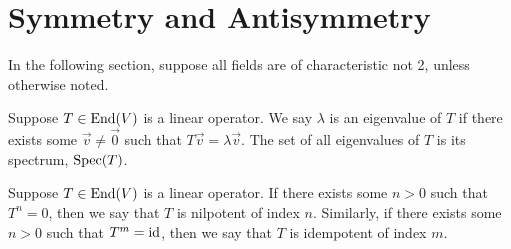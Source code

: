 \section{Symmetry and Antisymmetry}

\begin{remark}
    In the following section,
    suppose all fields are of characteristic not 2,
    unless otherwise noted.
\end{remark}

\begin{definition}
    Suppose \(T \in \operatorname{End}(V)\) is a linear operator.
    We say \(\lambda\) is an eigenvalue of \(T\)
    if there exists some \(\vec{v} \neq \vec{0}\) such that \(T\vec{v} = \lambda\vec{v}\).
    The set of all eigenvalues of \(T\) is its spectrum, \(\operatorname{Spec}(T)\).
\end{definition}
\begin{definition}
    Suppose \(T \in \operatorname{End}(V)\) is a linear operator.
    If there exists some \(n > 0\) such that \(T^n = 0\),
    then we say that \(T\) is nilpotent of index \(n\).
    Similarly, if there exists some \(n > 0\) such that \(T^m = \operatorname{id}\),
    then we say that \(T\) is idempotent of index \(m\).
\end{definition}

